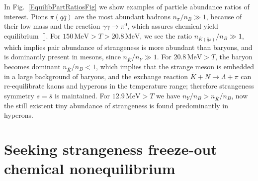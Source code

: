 In Fig.~\ref{EquilibPartRatiosFig} we show examples of particle abundance ratios of interest. %
Pions $\pi(q\bar q)$ are the most abundant hadrons $n_\pi/n_B\gg1$, because of their low mass and the reaction $\gamma\gamma\rightarrow\pi^0$, which assures chemical yield equilibrium~[\cite{Kuznetsova:2008jt}]. For $150\,\mathrm{MeV}>T>20.8\,\mathrm{MeV}$, we see the ratio $n_{{\overline K}(\bar q s)}/n_B\gg1$, which implies pair abundance of strangeness is more abundant than baryons, and is dominantly present in mesons, since $n_{\overline K}/n_Y\gg1$. 
For $20.8\,\mathrm{MeV}>T$, the baryon becomes dominant $n_{\overline K}/n_B<1$, which implies that the strange meson is embedded in a large background of baryons, and the exchange reaction $\overline{K}+N\rightarrow \Lambda+\pi$ can re-equilibrate kaons and hyperons in the temperature range; therefore strangeness symmetry $s=\bar s$ is maintained. For $12.9\,\mathrm{MeV}>T$ we have $n_Y/n_B>n_{\overline K}/n_B$, now the still existent tiny abundance of strangeness is found predominantly in hyperons.




\section{Seeking strangeness freeze-out chemical nonequilibrium
}


